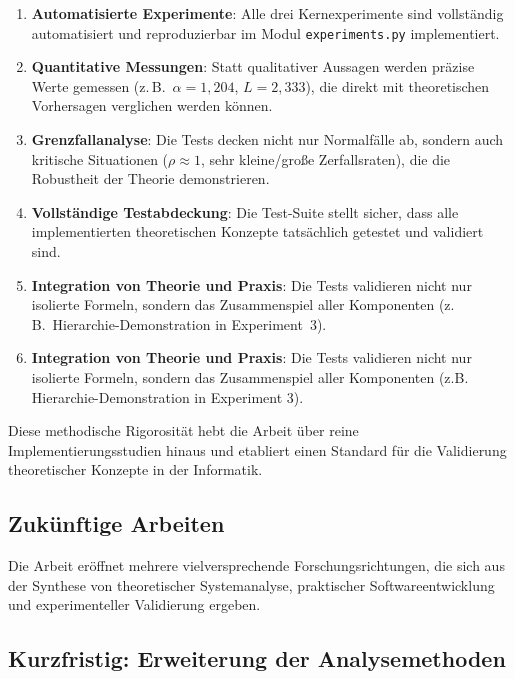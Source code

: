 ﻿\documentclass[a4paper,12pt]{report}
\theoremstyle{definition}
\begin{document}
\begin{enumerate}
	\item[-] \textbf{Automatisierte Experimente}: Alle drei Kernexperimente
	sind vollständig automatisiert und reproduzierbar im Modul
	\texttt{experiments.py} implementiert.
	
	\item[-] \textbf{Quantitative Messungen}: Statt qualitativer Aussagen
	werden präzise Werte gemessen (z.\,B.\ $\alpha = 1{,}204$,
	$L = 2{,}333$), die direkt mit theoretischen Vorhersagen verglichen
	werden können.
	
	\item[-] \textbf{Grenzfallanalyse}: Die Tests decken nicht nur
	Normalfälle ab, sondern auch kritische Situationen ($\rho \approx 1$,
	sehr kleine/große Zerfallsraten), die die Robustheit der Theorie
	demonstrieren.
	
	\item[-] \textbf{Vollständige Testabdeckung}: Die Test-Suite stellt
	sicher, dass alle implementierten theoretischen Konzepte tatsächlich
	getestet und validiert sind.
	
	\item[-] \textbf{Integration von Theorie und Praxis}: Die Tests
	validieren nicht nur isolierte Formeln, sondern das Zusammenspiel
	aller Komponenten (z.\,B.\ Hierarchie-Demonstration in Experiment~3).
	
	\item[-] \textbf{Integration von Theorie und Praxis}: Die Tests validieren nicht nur isolierte Formeln, sondern das Zusammenspiel aller Komponenten (z.B. Hierarchie-Demonstration in Experiment 3).
\end{enumerate}

Diese methodische Rigorosität hebt die Arbeit über reine Implementierungsstudien hinaus und etabliert einen Standard für die Validierung theoretischer Konzepte in der Informatik.

\subsection{Zukünftige Arbeiten}

Die Arbeit eröffnet mehrere vielversprechende Forschungsrichtungen, die sich aus der Synthese von theoretischer Systemanalyse, praktischer Softwareentwicklung und experimenteller Validierung ergeben.

\subsection{Kurzfristig: Erweiterung der Analysemethoden}
\end{document}
